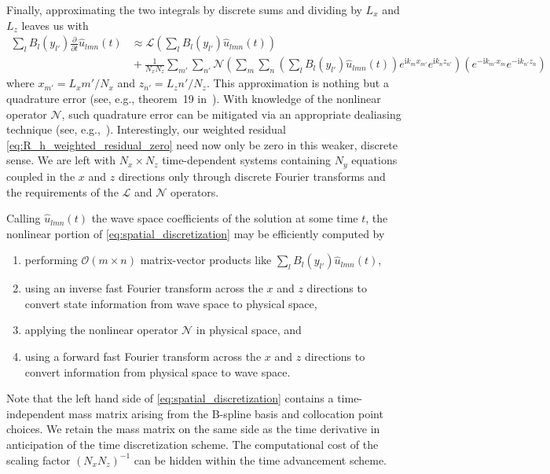 \documentclass[letterpaper,11pt,nointlimits,reqno]{amsart}
\newcommand{\ii}{\ensuremath{\mathrm{i}}}
\begin{document}
Finally, approximating the two integrals by discrete sums and dividing
by $L_x$ and $L_z$ leaves us with
\begin{align}
  \sum_{l} B_l\!\left(y_{l'}\right)
  \frac{\partial}{\partial{}t} \hat{u}_{l m n}(t)
  &\approx
  \mathscr{L}\left(
    \sum_{l}
     B_l\!\left(y_{l'}\right)
    \hat{u}_{l m n}(t)
  \right)
\\
  &{}+
  \frac{1}{N_x N_z}
  \sum_{m'} \sum_{n'}
  \mathscr{N}\left(
    \sum_{m}
    \sum_{n}
    \left(
      \sum_{l} B_l\!\left(y_{l'}\right)
      \hat{u}_{l m n}(t)
    \right)
    e^{\ii k_m x_{m'}}e^{\ii k_n z_{n'}}
  \right)
  \left(
    e^{-\ii k_{m'} x_m}e^{-\ii k_{n'} z_n}
  \right)
  \label{eq:spatial_discretization}
\end{align}
where $x_{m'}=L_x m' / N_x$ and $z_{n'}=L_z n' / N_z$.  This approximation is
nothing but a quadrature error (see, e.g., theorem~19 in~\cite{Boyd2001}).
With knowledge of the nonlinear operator $\mathscr{N}$, such quadrature error
can be mitigated via an appropriate dealiasing technique (see,
e.g.,~\cite{Canuto2006}).  Interestingly, our weighted residual
\eqref{eq:R_h_weighted_residual_zero} need now only be zero in this weaker,
discrete sense.  We are left with $N_x\times{}N_z$ time-dependent systems
containing $N_y$ equations coupled in the $x$ and $z$ directions only through
discrete Fourier transforms and the requirements of the $\mathscr{L}$ and
$\mathscr{N}$ operators.

Calling $\hat{u}_{l m n}(t)$ the wave space coefficients of the solution at
some time $t$, the nonlinear portion of \eqref{eq:spatial_discretization} may
be efficiently computed by
\begin{enumerate}
 \item performing $\mathcal{O}\!\left(m\times{}n\right)$ matrix-vector products
       like $\sum_{l} B_l\!\left(y_{l'}\right) \hat{u}_{l m n}(t)$,
 \item using an inverse fast Fourier transform across
       the $x$ and $z$ directions to convert state information from wave space
       to physical space,
 \item applying the nonlinear operator $\mathscr{N}$ in physical space, and
 \item using a forward fast Fourier transform across the $x$ and $z$
       directions to convert information from physical space to wave space.
\end{enumerate}
Note that the left hand side of \eqref{eq:spatial_discretization} contains a
time-independent mass matrix arising from the B-spline basis and collocation
point choices.  We retain the mass matrix on the same side as the time
derivative in anticipation of the time discretization scheme.  The
computational cost of the scaling factor $\left(N_x N_z\right)^{-1}$
can be hidden within the time advancement scheme.
\end{document}
